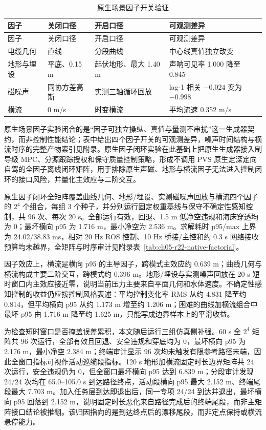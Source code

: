 \begin{longtable}[]{@{}llll@{}}
\caption{原生场景因子开关验证}\label{tab:ch05-r21-native-factors}\tabularnewline
\toprule\noalign{}
因子 & 关闭口径 & 开启口径 & 可观测差异 \\
\midrule\noalign{}
\endfirsthead
\toprule\noalign{}
因子 & 关闭口径 & 开启口径 & 可观测差异 \\
\midrule\noalign{}
\endhead
\bottomrule\noalign{}
\endlastfoot
电缆几何 & 直线 & 分段曲线 & 中心线真值独立改变 \\
地形与埋设 & 平底、0.15 m & 起伏地形、最大 1.40 m & 声呐可见率 1.000 降至 0.845 \\
磁噪声 & 同协方差高斯 & 实测三轴循环回放 & lag-1 相关 \(-0.024\) 变为 \(-0.998\) \\
横流 & 0 m/s & 时变横流 & 平均流速 0.352 m/s \\
\end{longtable}

原生场景因子实验闭合的是``因子可独立操纵、真值与量测不串扰''这一生成器契约，而非控制性能结论；表中给出四个因子开关的可观测差异，噪声时间结构与横流时序的完整产物索引见附录。原生因子闭环实验在此基础上把原生生成器接入制导级 MPC、分源跟踪授权和保守质量控制策略，形成不调用 PVS 原生定深定向自驾的全因子离线闭环矩阵，用于排除原生声磁、地形与横流因子无法进入控制闭环的接口风险，并量化主效应与二阶交互。

原生因子闭环全矩阵覆盖曲线几何、地形/埋设、实测磁噪声回放与横流四个因子的 \(2^4\) 个组合，每组 3 个种子，并分别运行固定权重基线与保守不确定性感知控制，共 96 次、每次 20 s。全部运行有效，回退、1.5 m 低净空违规和海床穿透均为 0；最坏横向 p95 为 1.716 m，最小净空为 2.536 m。求解耗时 p95/max 上界为 24.02/38.83 ms，相对 20 Hz ROS 控制、10 Hz 桥接/主控和约 0.3 s 网络接收预算均未越界，全矩阵与时序审计见附录表~\ref{tab:ch05-r22-native-factorial}。

因子效应上，横流是横向 p95 的主导因子，跨模式主效应约 0.639 m；曲线几何与横流构成主要二阶交互，跨模式约 0.396 m。地形/埋设与实测噪声回放在 20 s 短时窗口内主效应接近零，说明当前压力主要来自平面几何和水体速度。不确定性感知控制的收益仍应按控制风格表述：平均控制变化率 RMS 从约 4.831 降至约 0.814，但平均横向 p95 从约 1.173 m 增至约 1.206 m；困难的曲线加横流组合中最坏 p95 由 1.716 m 降至约 1.625 m，只能写成边界样本上的平滑收益。

为检查短时窗口是否掩盖误差累积，本文随后运行三组仿真侧补强。60 s 全 \(2^4\) 矩阵共 96 次运行，全部有效且回退、安全违规和穿底均为 0，最坏横向 p95 为 2.176 m，最小净空 2.384 m；终端审计显示 96 次均未触发有限参考路径末端，因此全窗口指标可视作活动巡缆段指标。120 s 地形加横流固定时长边界矩阵共 24 次运行，安全违规仍为 0，但全窗口最坏横向 p95 达到 6.839 m；分段审计发现 24/24 次均在 65.0--105.0 s 到达路径终点，活动段横向 p95 最大 2.152 m、终端尾段最大 7.703 m。加入任务层到达即退出后，同一专项 24/24 到达并退出，最坏横向 p95 回落到 2.152 m，说明固定时长恶化来自路径完成后的终端尾段，而非主矩阵接口结论被推翻。该归因指向的是到达终点后的漂移尾段，而非定点保持或横流悬停能力。

